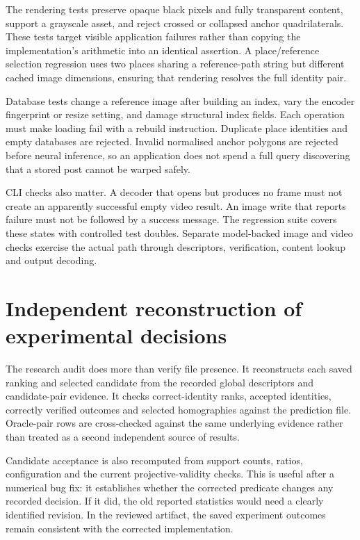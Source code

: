 The rendering tests preserve opaque black pixels and fully transparent content, support a grayscale asset, and reject crossed or collapsed anchor quadrilaterals. These tests target visible application failures rather than copying the implementation's arithmetic into an identical assertion. A place/reference selection regression uses two places sharing a reference-path string but different cached image dimensions, ensuring that rendering resolves the full identity pair.

Database tests change a reference image after building an index, vary the encoder fingerprint or resize setting, and damage structural index fields. Each operation must make loading fail with a rebuild instruction. Duplicate place identities and empty databases are rejected. Invalid normalised anchor polygons are rejected before neural inference, so an application does not spend a full query discovering that a stored post cannot be warped safely.

CLI checks also matter. A decoder that opens but produces no frame must not create an apparently successful empty video result. An image write that reports failure must not be followed by a success message. The regression suite covers these states with controlled test doubles. Separate model-backed image and video checks exercise the actual path through descriptors, verification, content lookup and output decoding.

\section{Independent reconstruction of experimental decisions}
The research audit does more than verify file presence. It reconstructs each saved ranking and selected candidate from the recorded global descriptors and candidate-pair evidence. It checks correct-identity ranks, accepted identities, correctly verified outcomes and selected homographies against the prediction file. Oracle-pair rows are cross-checked against the same underlying evidence rather than treated as a second independent source of results.

Candidate acceptance is also recomputed from support counts, ratios, configuration and the current projective-validity checks. This is useful after a numerical bug fix: it establishes whether the corrected predicate changes any recorded decision. If it did, the old reported statistics would need a clearly identified revision. In the reviewed artifact, the saved experiment outcomes remain consistent with the corrected implementation.

